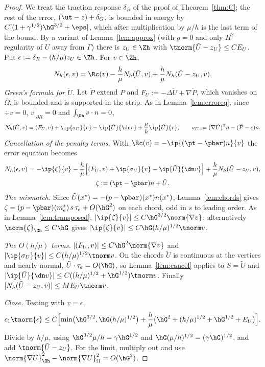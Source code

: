 \begin{proof}
We treat the traction response $\delta_R$ of the proof of Theorem~\ref{thm:C}; the rest of the error, $(\ut-z)+\delta_G$, is bounded in energy by $C[(1+\gamma^{1/2})\hG^{3/2}+\eps]$, which after multiplication by $\mu/h$ is the last term of the bound. By a variant of Lemma~\ref{lem:approx} (with $g=0$ and only $H^2$ regularity of $U$ away from $\Gamma$) there is $z_U\in\Zh$ with $\tnorm{\tilde U-z_U}\le CE_U$. Put $\epsilon:=\delta_R-(h/\mu)z_U\in\Zh$. For $v\in\Zh$,
\[
N_h(\epsilon,v)=\Rc(v)-\frac h\mu N_h(\tilde U,v)+\frac h\mu N_h(\tilde U-z_U,v).
\]
\emph{Green's formula for $\tilde U$.} Let $\tilde P$ extend $P$ and $F_U:=-\Delta\tilde U+\nabla\tilde P$, which vanishes on $\Omega$, is bounded and is supported in the strip. As in Lemma~\ref{lem:erroreq}, since $\div v=0$, $v|_{\partial R}=0$ and $\int_{\Gh}v\cdot n=0$,
\[
N_h(\tilde U,v)=(F_U,v)+\ip{\sigma_U}{v}-\ip{\tilde U}{\dn v}+\frac\mu h\ip{\tilde U}{v},\qquad\sigma_U:=(\nabla\tilde U)^{\mathsf T}n-(\tilde P-c)n .
\]
\emph{Cancellation of the penalty terms.} With $\Rc(v)=-\ip{(\pt-\pbar)n}{v}$ the error equation becomes
\begin{gather*}
N_h(\epsilon,v)=-\ip{\zeta}{v}-\frac h\mu\Bigl[(F_U,v)+\ip{\sigma_U}{v}-\ip{\tilde U}{\dn v}\Bigr]+\frac h\mu N_h(\tilde U-z_U,v),\\
\zeta:=(\pt-\pbar)n+\tilde U .
\end{gather*}
\emph{The mismatch.} Since $\tilde U(x^\ast)=-(p-\pbar)(x^\ast)n(x^\ast)$, Lemma~\ref{lem:chords} gives $\zeta=(p-\pbar)(m_e^\ast)\,s\,\tau_e+O(\hG^2)$ on each chord, odd in $s$ to leading order. As in Lemma~\ref{lem:transposed}, $|\ip{\zeta}{v}|\le C\hG^{3/2}\norm{\nabla v}$; alternatively $\norm{\zeta}_{\Gh}\le C\hG$ gives $|\ip{\zeta}{v}|\le C\hG(h/\mu)^{1/2}\tnorm v$.

\emph{The $O(h/\mu)$ terms.} $|(F_U,v)|\le C\hG^2\norm{\nabla v}$ and $|\ip{\sigma_U}{v}|\le C(h/\mu)^{1/2}\tnorm v$. On the chords $\tilde U$ is continuous at the vertices and nearly normal, $\tilde U\cdot\tau_e=O(\hG)$, so Lemma~\ref{lem:cancel} applies to $S=\tilde U$ and $|\ip{\tilde U}{\dn v}|\le C((h/\mu)^{1/2}+\hG^{1/2})\tnorm v$. Finally $|N_h(\tilde U-z_U,v)|\le ME_U\tnorm v$.

\emph{Close.} Testing with $v=\epsilon$,
\[
c_1\tnorm{\epsilon}\le C\Bigl[\min\bigl(\hG^{3/2},\hG(h/\mu)^{1/2}\bigr)+\frac h\mu\bigl(\hG^2+(h/\mu)^{1/2}+\hG^{1/2}+E_U\bigr)\Bigr].
\]
Divide by $h/\mu$, using $\hG^{3/2}\mu/h=\gamma\hG^{1/2}$ and $\hG(\mu/h)^{1/2}=(\gamma\hG)^{1/2}$, and add $\tnorm{\tilde U-z_U}$. For the limit, multiply out and use $\norm{\nabla\tilde U}^2_{\Oh}-\norm{\nabla U}^2_\Omega=O(\hG^2)$.
\end{proof}

